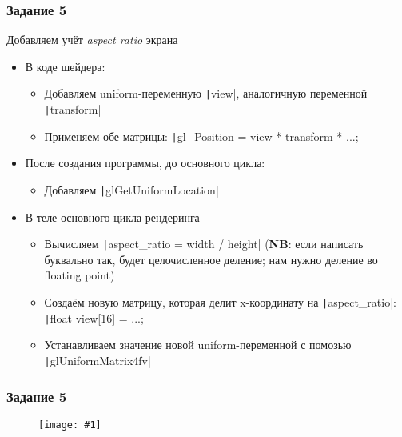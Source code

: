 \documentclass[10pt]{beamer}
\newcommand{\slideimage}[1]{
  \begin{figure}
    \begin{adjustbox}{width=\textwidth, totalheight=\textheight-2\baselineskip-2\baselineskip,keepaspectratio}
      \texttt{[image: \#1]}
    \end{adjustbox}
  \end{figure}
}
\begin{document}
\begin{frame}[fragile]
\frametitle{Задание 5}
Добавляем учёт \textit{aspect ratio} экрана
\begin{itemize}
\item В коде шейдера:
\begin{itemize}
\item Добавляем uniform-переменную \texttt|view|, аналогичную переменной \texttt|transform|
\item Применяем обе матрицы: \texttt|gl_Position = view * transform * ...;|
\end{itemize}
\item После создания программы, до основного цикла:
\begin{itemize}
\item Добавляем \texttt|glGetUniformLocation|
\end{itemize}
\item В теле основного цикла рендеринга
\begin{itemize}
\item Вычисляем \texttt|aspect_ratio = width / height| (\textbf{\alert{NB}}: если написать буквально так, будет целочисленное деление; нам нужно деление во floating point)
\item Создаём новую матрицу, которая делит x-координату на \texttt|aspect_ratio|:
\texttt|float view[16] = ...;|
\item Устанавливаем значение новой uniform-переменной с помозью \texttt|glUniformMatrix4fv|
\end{itemize}
\end{itemize}
\end{frame}

\begin{frame}
\frametitle{Задание 5}
\slideimage{5.png}
\end{frame}
\end{document}
